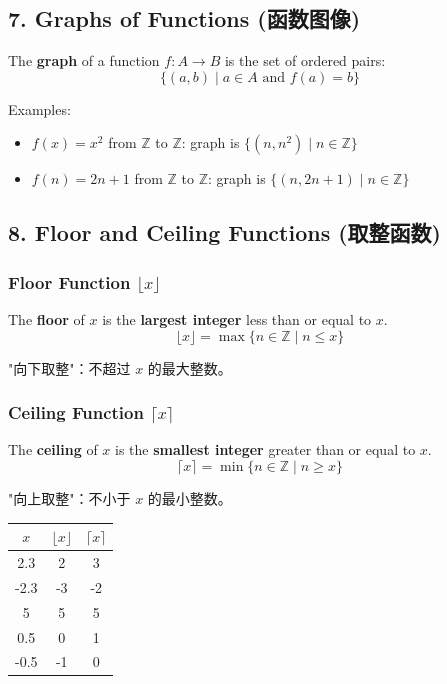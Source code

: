 \documentclass[10pt,a4paper,openany]{ctexbook}
\theoremstyle{definition}
\theoremstyle{remark}
\begin{document}
\subsection{7. Graphs of Functions (函数图像)}

The \textbf{graph} of a function $f: A \to B$ is the set of ordered pairs:
\[
\{(a, b) \mid a \in A \text{ and } f(a) = b\}
\]

Examples:
\begin{itemize}
\item $f(x) = x^2$ from $\mathbb{Z}$ to $\mathbb{Z}$: graph is $\{(n, n^2) \mid n \in \mathbb{Z}\}$
\item $f(n) = 2n + 1$ from $\mathbb{Z}$ to $\mathbb{Z}$: graph is $\{(n, 2n+1) \mid n \in \mathbb{Z}\}$

\end{itemize}

\vspace{-2pt}

\subsection{8. Floor and Ceiling Functions (取整函数)}

\subsubsection{Floor Function $\lfloor x \rfloor$}

The \textbf{floor} of $x$ is the \textbf{largest integer} less than or equal to $x$.
\[
\lfloor x \rfloor = \max\{n \in \mathbb{Z} \mid n \le x\}
\]

"向下取整"：不超过 $x$ 的最大整数。
\subsubsection{Ceiling Function $\lceil x \rceil$}

The \textbf{ceiling} of $x$ is the \textbf{smallest integer} greater than or equal to $x$.
\[
\lceil x \rceil = \min\{n \in \mathbb{Z} \mid n \ge x\}
\]

"向上取整"：不小于 $x$ 的最小整数。
\begin{center}
\begin{tabular}{ccc}
\hline
$x$ & $\lfloor x \rfloor$ & $\lceil x \rceil$ \\ \hline
2.3 & 2 & 3 \\
-2.3 & -3 & -2 \\
5 & 5 & 5 \\
0.5 & 0 & 1 \\
-0.5 & -1 & 0 \\
\hline
\end{tabular}

\end{center}
\end{document}
